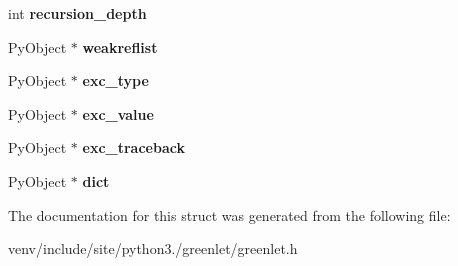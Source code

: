 \begin{DoxyCompactItemize}
int {\bfseries recursion\+\_\+depth}
\item 
\mbox{\label{struct__greenlet_a65f334b4aa126e54af327da15734f75c}} 
Py\+Object $\ast$ {\bfseries weakreflist}
\item 
\mbox{\label{struct__greenlet_aabd535cc093ef2be37bef72835297f20}} 
Py\+Object $\ast$ {\bfseries exc\+\_\+type}
\item 
\mbox{\label{struct__greenlet_acb84d5578e8928f55fc112ebd77ced5a}} 
Py\+Object $\ast$ {\bfseries exc\+\_\+value}
\item 
\mbox{\label{struct__greenlet_a51fcbd9622ebe611ebf4edc36f0427fa}} 
Py\+Object $\ast$ {\bfseries exc\+\_\+traceback}
\item 
\mbox{\label{struct__greenlet_a0047d8f9f4d95547a8fe4803192a858a}} 
Py\+Object $\ast$ {\bfseries dict}
\end{DoxyCompactItemize}


The documentation for this struct was generated from the following file\+:\begin{DoxyCompactItemize}
\item 
venv/include/site/python3./greenlet/greenlet.\+h\end{DoxyCompactItemize}
